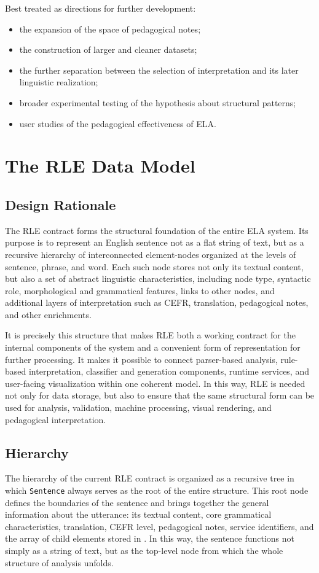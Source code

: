 \documentclass[12pt,a4paper,oneside]{report}
\begin{document}
Best treated as directions for further development:
\begin{itemize}
  \item the expansion of the space of pedagogical notes;
  \item the construction of larger and cleaner datasets;
  \item the further separation between the selection of interpretation and its later linguistic realization;
  \item broader experimental testing of the hypothesis about structural patterns;
  \item user studies of the pedagogical effectiveness of ELA.
\end{itemize}

\chapter{The RLE Data Model}
\section{Design Rationale}
The RLE contract forms the structural foundation of the entire ELA system. Its purpose is to represent an English sentence not as a flat string of text, but as a recursive hierarchy of interconnected element-nodes organized at the levels of sentence, phrase, and word. Each such node stores not only its textual content, but also a set of abstract linguistic characteristics, including node type, syntactic role, morphological and grammatical features, links to other nodes, and additional layers of interpretation such as CEFR, translation, pedagogical notes, and other enrichments.

It is precisely this structure that makes RLE both a working contract for the internal components of the system and a convenient form of representation for further processing. It makes it possible to connect parser-based analysis, rule-based interpretation, classifier and generation components, runtime services, and user-facing visualization within one coherent model. In this way, RLE is needed not only for data storage, but also to ensure that the same structural form can be used for analysis, validation, machine processing, visual rendering, and pedagogical interpretation.

\section{Hierarchy}
The hierarchy of the current RLE contract is organized as a recursive tree in which \texttt{Sentence} always serves as the root of the entire structure. This root node defines the boundaries of the sentence and brings together the general information about the utterance: its textual content, core grammatical characteristics, translation, CEFR level, pedagogical notes, service identifiers, and the array of child elements stored in . In this way, the sentence functions not simply as a string of text, but as the top-level node from which the whole structure of analysis unfolds.
\end{document}
